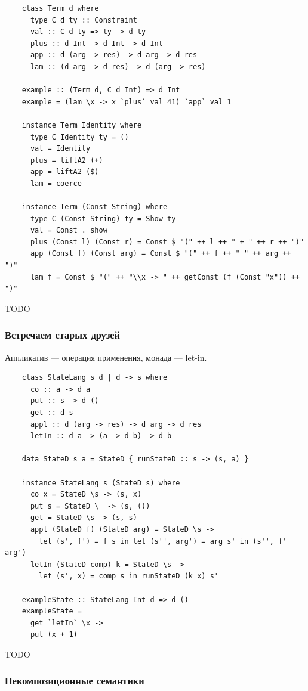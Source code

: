 \begin{verbatim}
    class Term d where
      type C d ty :: Constraint
      val :: C d ty => ty -> d ty
      plus :: d Int -> d Int -> d Int
      app :: d (arg -> res) -> d arg -> d res
      lam :: (d arg -> d res) -> d (arg -> res)

    example :: (Term d, C d Int) => d Int
    example = (lam \x -> x `plus` val 41) `app` val 1

    instance Term Identity where
      type C Identity ty = ()
      val = Identity
      plus = liftA2 (+)
      app = liftA2 ($)
      lam = coerce

    instance Term (Const String) where
      type C (Const String) ty = Show ty
      val = Const . show
      plus (Const l) (Const r) = Const $ "(" ++ l ++ " + " ++ r ++ ")"
      app (Const f) (Const arg) = Const $ "(" ++ f ++ " " ++ arg ++ ")"
      lam f = Const $ "(" ++ "\\x -> " ++ getConst (f (Const "x")) ++ ")"
\end{verbatim}

TODO %

\subsubsection{Встречаем старых друзей}

Аппликатив --- операция применения, монада --- let-in.

\begin{verbatim}
    class StateLang s d | d -> s where
      co :: a -> d a
      put :: s -> d ()
      get :: d s
      appl :: d (arg -> res) -> d arg -> d res
      letIn :: d a -> (a -> d b) -> d b

    data StateD s a = StateD { runStateD :: s -> (s, a) }

    instance StateLang s (StateD s) where
      co x = StateD \s -> (s, x)
      put s = StateD \_ -> (s, ())
      get = StateD \s -> (s, s)
      appl (StateD f) (StateD arg) = StateD \s ->
        let (s', f') = f s in let (s'', arg') = arg s' in (s'', f' arg')
      letIn (StateD comp) k = StateD \s ->
        let (s', x) = comp s in runStateD (k x) s'

    exampleState :: StateLang Int d => d ()
    exampleState =
      get `letIn` \x ->
      put (x + 1)
\end{verbatim}

TODO %

\subsubsection{Некомпозиционные семантики}

